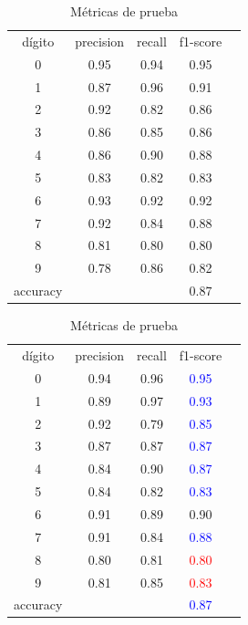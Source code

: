 \documentclass[paper=letter, fontsize=11pt]{scrartcl}
\numberwithin{equation}{section} %
\numberwithin{figure}{section} %
\numberwithin{table}{section} %
\begin{document}
\begin{table}[H]
    \centering 
    \caption{Métricas de los conjuntos de entrenamiento y prueba, usando LDA.} \label{metricas_lda}
\begin{minipage}{.5\linewidth}
        \caption{Métricas de entrenamiento}
        \centering
        \begin{tabular}{|c|c|c|c|c}
        \hline
dígito  & precision &  recall & f1-score\\
0       &    0.95  &  0.94   &  0.95\\  
1       &    0.87  &  0.96   &  0.91\\  
2       &    0.92  &  0.82   &  0.86\\  
3       &    0.86  &  0.85   &  0.86\\  
4       &    0.86  &  0.90   &  0.88\\  
5       &    0.83  &  0.82   &  0.83\\  
6       &    0.93  &  0.92   &  0.92\\  
7       &    0.92  &  0.84   &  0.88\\  
8       &    0.81  &  0.80   &  0.80\\  
9       &    0.78  &  0.86   &  0.82\\  \hline \hline
accuracy  & & & 0.87\\ \hline \hline
        \end{tabular}
    \end{minipage}%
    \begin{minipage}{.5\linewidth}
      \centering
        \caption{Métricas de prueba}
        \begin{tabular}{|c|c|c|c|c}
        \hline
        dígito  & precision &  recall & f1-score\\
0       &    0.94  &  0.96   &  \textcolor{blue}{0.95}\\  
1       &    0.89  &  0.97   &  \textcolor{blue}{0.93}\\  
2       &    0.92  &  0.79   &  \textcolor{blue}{0.85}\\  
3       &    0.87  &  0.87   &  \textcolor{blue}{0.87}\\  
4       &    0.84  &  0.90   &  \textcolor{blue}{0.87}\\  
5       &    0.84  &  0.82   &  \textcolor{blue}{0.83}\\  
6       &    0.91  &  0.89   &  0.90\\  
7       &    0.91  &  0.84   &  \textcolor{blue}{0.88}\\  
8       &    0.80  &  0.81   &  \textcolor{red}{0.80}\\  
9       &    0.81  &  0.85   &  \textcolor{red}{0.83}\\  \hline \hline
accuracy  & & & \textcolor{blue}{0.87}\\ \hline \hline
        \end{tabular}
    \end{minipage} 
\end{table}
\end{document}
